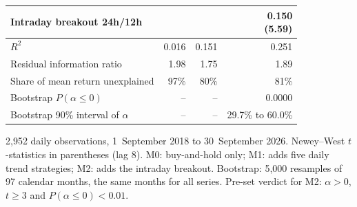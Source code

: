 \documentclass[11pt,a4paper]{article}
\newcommand{\1}{\mathbf{1}}
\begin{document}
\begin{table}[tbp]
\begin{threeparttable}
\begin{tabular}{lrrr}
Intraday breakout 24h/12h &  &  & \makecell[r]{0.150\\[-1pt]{\scriptsize(5.59)}} \\
\midrule
$R^2$ & 0.016 & 0.151 & 0.251 \\
Residual information ratio & 1.98 & 1.75 & 1.89 \\
Share of mean return unexplained & 97\% & 80\% & 81\% \\
Bootstrap $P(\alpha\le0)$ & -- & -- & 0.0000 \\
Bootstrap 90\% interval of $\alpha$ & -- & -- & 29.7\% to 60.0\% \\
\bottomrule
\end{tabular}
\begin{tablenotes}[flushleft]\footnotesize
\item 2{,}952 daily observations, 1~September 2018 to 30~September 2026. Newey--West $t$-statistics in parentheses (lag 8). M0: buy-and-hold only; M1: adds five daily trend strategies; M2: adds the intraday breakout. Bootstrap: 5{,}000 resamples of 97 calendar months, the same months for all series. Pre-set verdict for M2: $\alpha>0$, $t\ge3$ and $P(\alpha\le0)<0.01$.
\end{tablenotes}
\end{threeparttable}
\end{table}
\end{document}
